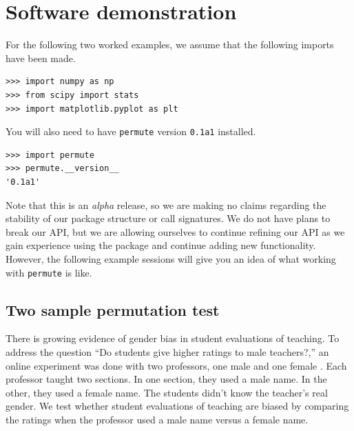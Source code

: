 \chapter{\label{app:ex}Software demonstration}

For the following two worked examples, we assume that the following imports 
have been made.

\begin{verbatim}
>>> import numpy as np
>>> from scipy import stats
>>> import matplotlib.pyplot as plt
\end{verbatim}

You will also need to have \texttt{permute} version \texttt{0.1a1} installed.

\begin{verbatim}
>>> import permute
>>> permute.__version__
'0.1a1'
\end{verbatim}

Note that this is an \emph{alpha} release, so we are making no claims
regarding the stability of our package structure or call signatures.  We do not
have plans to break our API, but we are allowing ourselves to continue refining
our API as we gain experience using the package and continue adding new
functionality.  However, the following example sessions will give you an idea
of what working with \texttt{permute} is like.

\section*{Two sample permutation test}

There is growing evidence of gender bias in student evaluations of teaching.
To address the question ``Do students give higher ratings to male teachers?,''
an online experiment was done with two professors, one male and one female
\cite{macnell2014s}.  Each professor taught two sections. In one section, they
used a male name.  In the other, they used a female name. The students didn't
know the teacher's real gender.  We test whether student evaluations of
teaching are biased by comparing the ratings when the professor used a male
name versus a female name.

